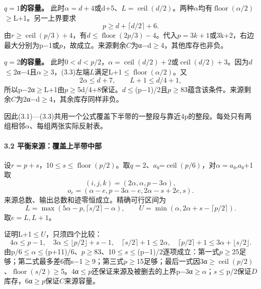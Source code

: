 \documentclass[11pt,a4paper]{article}
\theoremstyle{definition}
\numberwithin{equation}{section}
\begin{document}
\textbf{{\ensuremath{q=1}的容量。}} {此时\ensuremath{\alpha =d+4}或d+5、\ensuremath{L=\operatorname{ceil}(d/2)}。两种\ensuremath{\alpha }均有\ensuremath{\operatorname{floor}(\alpha /2)}\ensuremath{\ge}L+1。另一上界要求} \[
p\ge d+\lceil d/2\rceil+6.
\] {由\ensuremath{r}\ensuremath{\ge}\ensuremath{\operatorname{ceil}(p/3)+4}，有\ensuremath{d}\ensuremath{\le}\ensuremath{\operatorname{floor}(2p/3)-4}。代入\ensuremath{p=3k+1}或3k+2，右边最大分别为p−1或\ensuremath{p}，故成立。来源剩余\ensuremath{C}为α−d\ensuremath{\ge}4，其他库存也非负。}

\textbf{{\ensuremath{q=2}的容量。}} {此时\ensuremath{0<d<p/2}，\ensuremath{\alpha =\operatorname{ceil}(d/2)+2}或\ensuremath{\operatorname{ceil}(d/2)+3}。因为\ensuremath{d}\ensuremath{\le}2α−4且\ensuremath{\alpha }\ensuremath{\ge}3，(3.3)左端\ensuremath{L}满足L+1\ensuremath{\le}\ensuremath{\operatorname{floor}(\alpha /2)}。又} \[
2\alpha\le d+7,\qquad L+1\le d/4+1,
\] {所以p−2α\ensuremath{\ge}L+1由\ensuremath{p}\ensuremath{\ge}5d/4+8保证。\ensuremath{d}\ensuremath{\le}(p−1)/2且\ensuremath{p}\ensuremath{\ge}83蕴含该条件。来源剩余\ensuremath{C}为2α−d\ensuremath{\ge}4，其余库存同样非负。}

{因此(3.1)---(3.3)共用一个公式覆盖下半带的一整段与靠近4p的整段。每处只有两组相邻\ensuremath{\alpha }、每组两张实际反射表。}

\paragraph*{\texorpdfstring{{3.2} {平衡来源：覆盖上半带中部}}{3.2 平衡来源：覆盖上半带中部}}\label{C18-h133}

{设\ensuremath{r=p+s}，10\ensuremath{\le}\ensuremath{s}\ensuremath{\le}\ensuremath{\operatorname{floor}(p/2)}。取\ensuremath{q=2}、\ensuremath{a}₀=\ensuremath{\operatorname{ceil}(p/6)}，对\ensuremath{\alpha =a}₀,\ensuremath{a}₀+1取} \[
\boxed{(i,j,k)=(2\alpha,\alpha,p-3\alpha),}
\] \[
\boxed{o_e=(\alpha-e,p-3\alpha-e,2\alpha-s+2e,s).}
\tag{C18.3.4}
\] {来源总数、输出总数和迹零恒成立。精确可行区间为} \[
L=\max(5\alpha-p,\lceil s/2\rceil-\alpha),\qquad
U=\min(\alpha,2\alpha+s-\lceil p/2\rceil).
\tag{C18.3.5}
\] {取\ensuremath{e=L,L+1}。}

{证明L+1\ensuremath{\le}\ensuremath{U}，只须四个比较：} \[
4\alpha\le p-1,\quad
3\alpha\le\lfloor p/2\rfloor+s-1,\quad
\lceil s/2\rceil+1\le2\alpha,\quad
\lceil p/2\rceil+1\le3\alpha+\lfloor s/2\rfloor.
\tag{C18.3.6}
\] {由p/6\ensuremath{\le}\ensuremath{\alpha }\ensuremath{\le}(p+11)/6、\ensuremath{p}\ensuremath{\ge}83、10\ensuremath{\le}\ensuremath{s}\ensuremath{\le}(p−1)/2逐项成立：第一式\ensuremath{p}\ensuremath{\ge}25足够；第二式最多差6而s−1\ensuremath{\ge}9；第三式\ensuremath{p}\ensuremath{\ge}15足够；最后一式因3α\ensuremath{\ge}\ensuremath{\operatorname{ceil}(p/2)}、\ensuremath{\operatorname{floor}(s/2)}\ensuremath{\ge}5。4α\ensuremath{\le}\ensuremath{p}还保证来源及被删去的上界p−3α\ensuremath{\ge}\ensuremath{\alpha }；\ensuremath{s}\ensuremath{\le}p/2保证\ensuremath{D}库存，6α\ensuremath{\ge}\ensuremath{p}保证\ensuremath{C}来源容量。}
\end{document}
